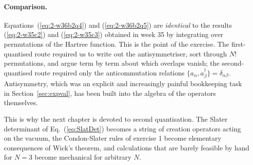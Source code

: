 \paragraph{Comparison.}
Equations~(\ref{eq:2-w36b2q4}) and (\ref{eq:2-w36b2q5}) are \emph{identical}
to the results (\ref{eq:2-w35c2}) and (\ref{eq:2-w35c3}) obtained in week 35
by integrating over permutations of the Hartree function.  This is the point
of the exercise.  The first-quantised route required us to write out the
antisymmetriser, sort through $N!$ permutations, and argue term by term about
which overlaps vanish; the second-quantised route required only the
anticommutation relations $\{a_{\alpha},a^{\dagger}_{\beta}\}=
\delta_{\alpha\beta}$.  Antisymmetry, which was an explicit and increasingly
painful bookkeeping task in Section~\ref{sec:expval}, has been built into the
algebra of the operators themselves.

This is why the next chapter is devoted to second quantisation.  The Slater
determinant of Eq.~(\ref{eq:SlatDet}) becomes a string of creation operators
acting on the vacuum, the Condon-Slater rules of exercise 1 become elementary
consequences of Wick's theorem, and calculations that are barely feasible by
hand for $N=3$ become mechanical for arbitrary $N$.
